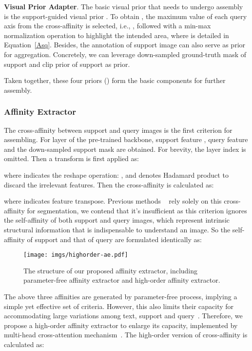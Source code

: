 \documentclass[lettersize,journal]{IEEEtran}
\begin{document}
\textbf{}\textbf{Visual Prior Adapter}. The basic visual prior that needs to undergo assembly is the support-guided visual prior . To obtain , the maximum value of each query axis from the cross-affinity  is selected, i.e., , followed with a min-max normalization operation to highlight the intended area, where  is detailed in Equation~\ref{Asq}. Besides, the annotation of support image can also serve as prior for aggregation. Concretely, we can leverage down-sampled ground-truth mask of support  and clip prior of support  as prior.

Taken together, these four priors () form the basic components for further assembly.

\subsubsection{Affinity Extractor}
\label{subsubsection:AE} 
The cross-affinity between support and query images is the first criterion for assembling. For layer  of the pre-trained backbone, support feature , query feature  and the down-sampled support mask  are obtained. For brevity, the layer index  is omitted. Then a transform is first applied as:

where  indicates the reshape operation: , and  denotes Hadamard product to discard the irrelevant features. Then the  cross-affinity  is calculated as:

where  indicates feature transpose. Previous methods ~\cite{min2021hypercorrelation,shi2022dense} rely solely on this cross-affinity  for segmentation, we contend that it's insufficient as this criterion ignores the self-affinity of both support and query images, which represent intrinsic structural information that is indispensable to understand an image. So the self-affinity of support  and that of query  are formulated identically as:


\begin{figure}[t]
  \centering
  \texttt{[image: imgs/highorder-ae.pdf]}
  \caption{The structure of our proposed affinity extractor, including parameter-free affinity extractor and high-order affinity extractor.}
  \label{fig:ae}
\end{figure}


The above three affinities are generated by parameter-free process, implying a simple yet effective set of criteria. However, this also limits their capacity for accommodating large variations among text, support and query~\cite{ZhangWWG22}. Therefore, we propose a high-order affinity extractor to enlarge its capacity, implemented by multi-head cross-attention mechanism~\cite{vaswani2017attention}. The high-order version of cross-affinity  is calculated as:
\end{document}

